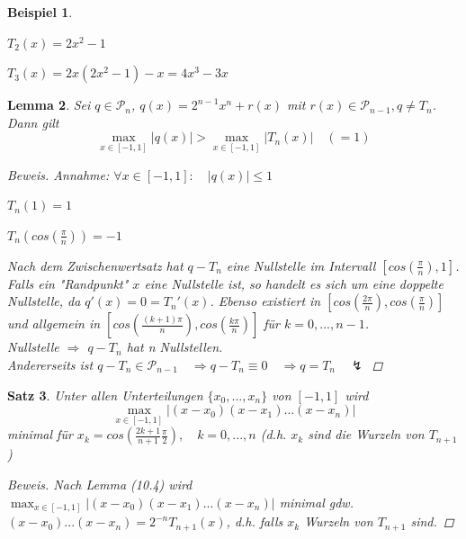 \documentclass[12pt]{article}
\theoremstyle{break}
\newtheorem{theorem}{Satz}[subsection]
\newtheorem{lemma}[theorem]{Lemma}
\newtheorem{example}[theorem]{Beispiel}
\begin{document}
\begin{example} \leavevmode
\begin{description}
  \item $T_2(x) = 2x^2 - 1$
  \item $T_3(x) = 2x(2x^2 -1) - x = 4x^3 -3x$
\end{description}
\end{example}

\begin{lemma}
Sei $q \in \mathcal{P}_n$, $q(x) = 2^{n-1} x^n + r(x)$ mit $r(x) \in \mathcal{P}_{n-1}, q \neq T_n$. Dann gilt
\[ \max_{x\in [-1, 1]} \vert q(x) \vert > \max_{x\in [-1, 1]} \vert T_n(x) \vert \quad(=1)\]

\begin{proof}[Beweis]\leavevmode
Annahme: $\forall x \in [-1, 1]: \quad \vert q(x) \vert \leq 1$
\begin{description}
  \item $T_n(1) = 1$
  \item $T_n(cos(\frac{\pi}{n})) = -1$
\end{description}
Nach dem Zwischenwertsatz hat $q-T_n$ eine Nullstelle im Intervall $[cos(\frac{\pi}{n}), 1]$. Falls ein "Randpunkt" $x$ eine Nullstelle ist, so handelt es sich um eine doppelte Nullstelle, da $q'(x) = 0 = T_n'(x)$. Ebenso existiert in $[cos(\frac{2\pi}{n}), cos(\frac{\pi}{n})]$ und allgemein in $[cos(\frac{(k+1)\pi}{n}), cos(\frac{k\pi}{n})]$ für $k=0,...,n-1$.\\
Nullstelle $\Rightarrow$ $q-T_n$ hat n Nullstellen.\\
Andererseits ist $q-T_n \in \mathcal{P}_{n-1} \quad \Rightarrow q-T_n \equiv 0 \quad \Rightarrow q = T_n \quad \lightning$
\end{proof}
\end{lemma}

\begin{theorem}
Unter allen Unterteilungen $\{x_0,...,x_n\}$ von $[-1,1]$ wird 
$$ \max_{x \in [-1, 1]} \vert (x-x_0)(x-x_1)...(x-x_n) \vert $$
minimal für $x_k = cos\left( \frac{2k+1}{n+1} \frac{\pi}{2}\right), \quad k=0,...,n$ (d.h. $x_k$ sind die Wurzeln von $T_{n+1}$)

\begin{proof}[Beweis]
Nach Lemma (10.4) wird $\max_{x \in [-1, 1]} \vert (x-x_0)(x-x_1)...(x-x_n) \vert$ minimal gdw.  $(x-x_0)...(x-x_n) = 2^{-n} T_{n+1}(x)$, d.h. falls $x_k$ Wurzeln von $T_{n+1}$ sind.
\end{proof}
\end{theorem}
\end{document}
